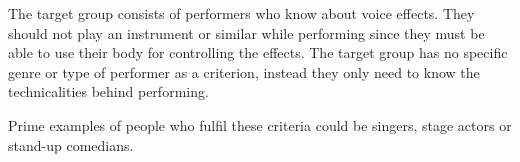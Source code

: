 The target group consists of performers who know about voice effects. They should not play an instrument or similar while performing since they must be able to use their body for controlling the effects. The target group has no specific genre or type of performer as a criterion, instead they only need to know the technicalities behind performing.

Prime examples of people who fulfil these criteria could be singers, stage actors or stand-up comedians.